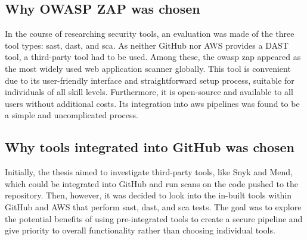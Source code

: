 \subsection{Why OWASP ZAP was chosen}
In the course of researching security tools, an evaluation was made of the three tool types: \acrshort{sast},  \acrshort{dast}, and \acrshort{sca}. As neither GitHub nor AWS provides a DAST tool, a third-party tool had to be used. Among these, the \acrshort{owasp} \acrshort{zap} appeared as the most widely used web application scanner globally. This tool is convenient due to its user-friendly interface and straightforward setup process, suitable for individuals of all skill levels. Furthermore, it is open-source and available to all users without additional costs. Its integration into \acrshort{aws} pipelines was found to be a simple and uncomplicated process.

\subsection{Why tools integrated into GitHub was chosen}
Initially, the thesis aimed to investigate third-party tools, like Snyk and Mend, which could be integrated into GitHub and run scans on the code pushed to the repository. Then, however, it was decided to look into the in-built tools within GitHub and AWS that perform \acrshort{sast}, \acrshort{dast}, and \acrshort{sca} tests. The goal was to explore the potential benefits of using pre-integrated tools to create a secure pipeline and give priority to overall functionality rather than choosing individual tools.

